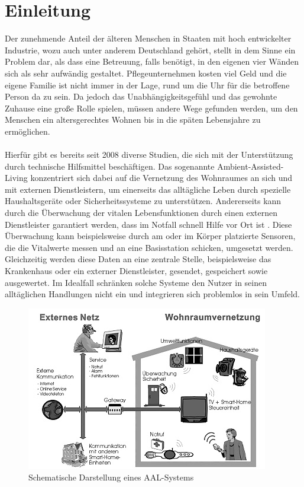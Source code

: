 \section{Einleitung}
Der zunehmende Anteil der älteren Menschen in Staaten mit hoch entwickelter Industrie, wozu auch unter anderem Deutschland gehört, stellt in dem Sinne ein Problem dar, als dass eine Betreuung, falls benötigt, in den eigenen vier Wänden sich als sehr aufwändig gestaltet. Pflegeunternehmen kosten viel Geld und die eigene Familie ist nicht immer in der Lage, rund um die Uhr für die betroffene Person da zu sein. Da jedoch das Unabhängigkeitsgefühl und das gewohnte Zuhause eine große Rolle spielen, müssen andere Wege gefunden werden, um den Menschen ein altersgerechtes Wohnen bis in die späten Lebensjahre zu ermöglichen.
\\
\\
Hierfür gibt es bereits seit 2008 diverse Studien, die sich mit der Unterstützung durch technische Hilfsmittel beschäftigen. Das sogenannte \glqq Ambient-Assisted-Living\grqq \cite{aal} konzentriert sich dabei auf die Vernetzung des Wohnraumes an sich und mit externen Dienstleistern, um einerseits das alltägliche Leben durch spezielle Haushaltsgeräte oder Sicherheitssysteme zu unterstützen. Andererseits kann durch die Überwachung der vitalen Lebensfunktionen durch einen externen Dienstleister garantiert werden, dass im Notfall schnell Hilfe vor Ort ist \cite{aaltm}. Diese Überwachung kann beispielsweise durch am oder im Körper platzierte Sensoren, die die Vitalwerte messen und an eine Basisstation schicken, umgesetzt werden. Gleichzeitig werden diese Daten an eine zentrale Stelle, beispielsweise das Krankenhaus oder ein externer Dienstleister, gesendet, gespeichert sowie ausgewertet. Im Idealfall schränken solche Systeme den Nutzer in seinen alltäglichen Handlungen nicht ein und integrieren sich problemlos in sein Umfeld.

\begin{figure}[h]
\begin{center}
\includegraphics[scale=0.9]{images/intelligente-vernetzung.jpg} 
\caption{Schematische Darstellung eines AAL-Systems}
\end{center}
\end{figure}


